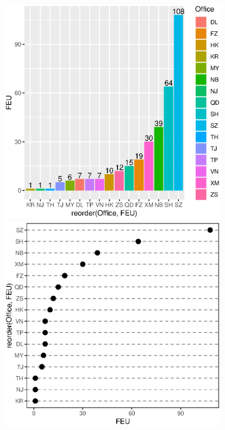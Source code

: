 \begin{figure}[ht]
\begin{center}
		\includegraphics[scale=0.4]{eps/Rplot04}
		\qquad
		\includegraphics[scale=0.4]{eps/Rplot10} \\

\end{center}
\end{figure}
